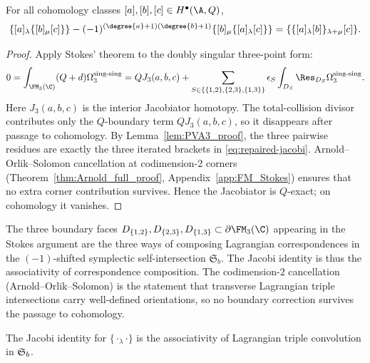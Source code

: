 \begin{theorem}
\label{thm:Jacobi}
For all cohomology classes $[a],[b],[c]\in H^\bullet(\A,Q)$,
\begin{equation}
\label{eq:repaired-jacobi}
\{[a]_\lambda\{[b]_\mu[c]\}\}
-
(-1)^{(\degree{a}+1)(\degree{b}+1)}
\{[b]_\mu\{[a]_\lambda[c]\}\}
=
\{\{[a]_\lambda[b]\}_{\lambda+\mu}[c]\}.
\end{equation}
\end{theorem}

\begin{proof}
Apply Stokes' theorem to the doubly singular three-point form:
\[
0
=
\int_{\FM_3(\C)}(Q+d)\Omega_3^{\mathrm{sing}\text{-}\mathrm{sing}}
=
QJ_3(a,b,c)+
\sum_{S\in\{\{1,2\},\{2,3\},\{1,3\}\}}
\epsilon_S\int_{D_S}\Res_{D_S}\Omega_3^{\mathrm{sing}\text{-}\mathrm{sing}}.
\]
Here $J_3(a,b,c)$ is the interior Jacobiator homotopy. The total-collision divisor
contributes only the $Q$-boundary term $QJ_3(a,b,c)$, so it disappears after passage
to cohomology. By Lemma~\ref{lem:PVA3_proof}, the three pairwise residues are exactly
the three iterated brackets in \eqref{eq:repaired-jacobi}. Arnold--Orlik--Solomon
cancellation at codimension-$2$ corners (Theorem~\ref{thm:Arnold_full_proof}, Appendix~\ref{app:FM_Stokes}) ensures that no extra corner contribution survives.
Hence the Jacobiator is $Q$-exact; on cohomology it vanishes.
\end{proof}

\begin{remark}
\label{rem:jacobi-lagrangian}
The three boundary faces $D_{\{1,2\}},D_{\{2,3\}},D_{\{1,3\}}\subset
\partial\FM_3(\C)$ appearing in the Stokes argument are the three ways of
composing Lagrangian correspondences in the $(-1)$-shifted symplectic
self-intersection $\mathfrak{S}_b$. The Jacobi identity is thus the
associativity of correspondence composition. The codimension-$2$ cancellation
(Arnold--Orlik--Solomon) is the statement that transverse Lagrangian triple
intersections carry well-defined orientations, so no boundary correction
survives the passage to cohomology.
\end{remark}

\begin{proposition}
\label{prop:jacobi-lagrangian-convolution}
The Jacobi identity for $\{{\cdot}_\lambda{\cdot}\}$ is the associativity
of Lagrangian triple convolution in $\mathfrak{S}_b$.
\end{proposition}

